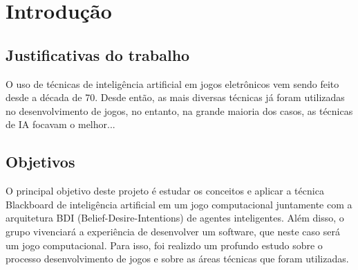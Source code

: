 \chapter{Introdução}


\section{Justificativas do trabalho}
O uso de técnicas de inteligência artificial em jogos eletrônicos vem sendo feito desde a década de 70. Desde então, as mais diversas técnicas já foram utilizadas no desenvolvimento de jogos, no entanto, na grande maioria dos casos, as técnicas de IA focavam o melhor...
\section{Objetivos}
O principal objetivo deste projeto é estudar os conceitos e aplicar a técnica Blackboard de inteligência artificial em um jogo computacional juntamente com a arquitetura BDI (Belief-Desire-Intentions) de agentes inteligentes. 
Além disso, o grupo vivenciará a experiência de desenvolver um software, que neste caso será um jogo computacional.
Para isso, foi realizdo um profundo estudo sobre o processo desenvolvimento de jogos e sobre as áreas técnicas que foram utilizadas.


